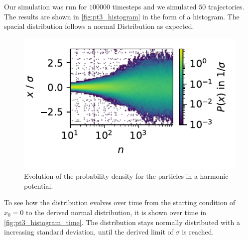 \documentclass[
    parskip=half, 
    twoside=false,
    twocolumn=true,
    fontsize=11pt,
]{scrarticle}
\begin{document}
Our simulation was run for $100000$ timesteps and we simulated $50$ trajectories. 
The results are shown in \autoref{fig:pt3_histogram} in the form of a histogram.
The spacial distribution follows a normal Distribution as expected.


\begin{figure}
    \centering
    \includegraphics{figures/03 histogram evolution.pdf}
    \caption{
        Evolution of the probability density for the particles in a harmonic potential.
    }
    \label{fig:pt3_histogram_time}
\end{figure}
To see how the distribution evolves over time from the starting condition of $x_0=0$ to the derived normal distribution, it is shown over time in \autoref{fig:pt3_histogram_time}.
The distribution stays normally distributed with a increasing standard deviation, until the derived limit of $\sigma$ is reached.
\end{document}
